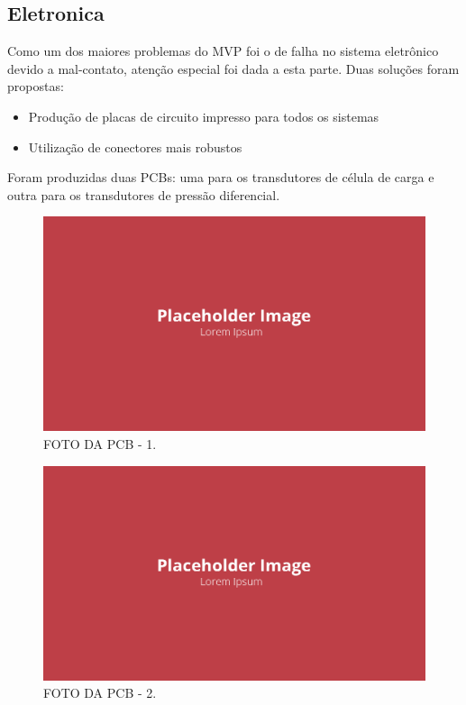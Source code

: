 \subsection{Eletronica}

Como um dos maiores problemas do MVP foi o de falha no sistema eletrônico devido a mal-contato, atenção especial foi dada a esta parte. Duas soluções foram propostas:

\begin{itemize}
    \item Produção de placas de circuito impresso para todos os sistemas
    \item Utilização de conectores mais robustos
\end{itemize}

Foram produzidas duas PCBs: uma para os transdutores de célula de carga e outra para os transdutores de pressão diferencial.

\begin{figure}[!ht]
    \centering
    \includegraphics[width=.8\linewidth]{figuras/placeholder.png}
    \caption{FOTO DA PCB - 1\cite{autor}.}
    \label{fig:placeholder}
\end{figure}

\begin{figure}[!ht]
    \centering
    \includegraphics[width=.8\linewidth]{figuras/placeholder.png}
    \caption{FOTO DA PCB - 2\cite{autor}.}
    \label{fig:placeholder}
\end{figure}

